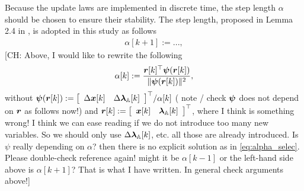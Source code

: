 \documentclass[journal]{IEEEtranTIE}
\newcommand{\CHHA}[1]{{\color{red} [CH: #1]}} %
\newcommand{\KYCH}[1]{{\color{blue} [KC: #1]}} %
\begin{document}

Because the update laws are implemented in discrete time, the step length $\alpha$ should be chosen to ensure their stability. The  step length, proposed in Lemma 2.4 in \cite{bhaya2006control}, is adopted in this study as follows
\begin{align}\label{eq:alpha_selec}
\alpha [k+1] := ...,
\end{align}
\CHHA{Above, I would like to rewrite the following \begin{align}%
\alpha [k] := \frac{ \mv{r}[k]^\top\mv{\psi} (\mv{r}[k])}{ \norm{\mv{\psi} (\mv{r}[k])}^2},
\end{align}
without  
$\mv{\psi} (\mv{r}[k]) := {\left[ {\begin{array}{*{20}{c}}
{\Delta \mv{x}[k]}&{{\Delta \mv{\lambda}_{\mathbb{A}}}[k]}
\end{array}} \right]^\top}/\alpha[k]$ ( note / check $\boldsymbol{\psi}$ does not depend on $\boldsymbol{r}$ as follows now!) and
 $\mv{r}[k] := {\left[ {\begin{array}{*{20}{c}}
{\mv{x}[k]}&{{\mv{\lambda}_{\mathbb{A}}}[k]}
\end{array}} \right]^\top}$, where I think is something wrong! I think we can ease reading if we do not introduce too many new variables. So we should only use $\Delta \boldsymbol{\lambda}_{\mathbb{A}}[k]$, etc. all those are already introduced.  Is $\psi$ really depending on $\alpha$? then there is no explicit solution as in \eqref{eq:alpha_selec}. Please double-check reference again! might it be $\alpha[k-1]$ or the left-hand side above is $\alpha [k+1]$? That is what I have written. In general check arguments above!}
\end{document}
